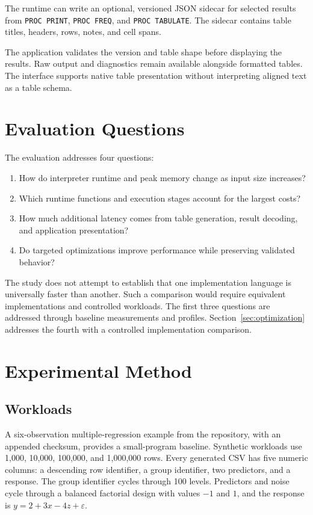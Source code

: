 \documentclass[11pt,a4paper]{article}
\begin{document}
The runtime can write an optional, versioned JSON sidecar for
selected results from \texttt{PROC PRINT},
\texttt{PROC FREQ}, and \texttt{PROC TABULATE}. The sidecar
contains table titles, headers, rows, notes, and cell spans.

The application validates the version and table shape before
displaying the results. Raw output and diagnostics remain
available alongside formatted tables. The interface supports
native table presentation without interpreting aligned text as
a table schema.

\section{Evaluation Questions}

The evaluation addresses four questions:
\begin{enumerate}
    \item How do interpreter runtime and peak memory change as
    input size increases?
    \item Which runtime functions and execution stages account
    for the largest costs?
    \item How much additional latency comes from table generation,
    result decoding, and application presentation?
    \item Do targeted optimizations improve performance while
    preserving validated behavior?
\end{enumerate}

The study does not attempt to establish that one implementation
language is universally faster than another. Such a comparison
would require equivalent implementations and controlled
workloads. The first three questions are addressed through
baseline measurements and profiles. Section~\ref{sec:optimization}
addresses the fourth with a controlled implementation comparison.

\section{Experimental Method}

\subsection{Workloads}

A six-observation multiple-regression example from the repository,
with an appended checksum, provides a small-program baseline.
Synthetic workloads use 1,000, 10,000, 100,000, and 1,000,000 rows.
Every generated CSV has five numeric columns: a descending row
identifier, a group identifier, two predictors, and a response.
The group identifier cycles through 100 levels. Predictors and
noise cycle through a balanced factorial design with values
$-1$ and $1$, and the response is
$y=2+3x-4z+\varepsilon$.
\end{document}
